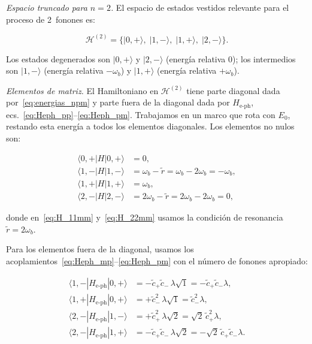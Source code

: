 \documentclass[12pt]{article}
\begin{document}

\textit{Espacio truncado para $n=2$.}
El espacio de estados vestidos relevante para el proceso de 2~fonones es:

\begin{equation}
	\mathcal{H}^{(2)} = \bigl\{
	|0,{+}\rangle,\;|1,{-}\rangle,\;|1,{+}\rangle,\;|2,{-}\rangle
	\bigr\}.
	\label{eq:espacio_n2}
\end{equation}

\noindent
Los estados degenerados son $|0,{+}\rangle$ y $|2,{-}\rangle$
(energía relativa $0$); los intermedios son $|1,{-}\rangle$
(energía relativa $-\omega_b$) y $|1,{+}\rangle$
(energía relativa $+\omega_b$).

\medskip
\noindent
\textit{Elementos de matriz.}
El Hamiltoniano en $\mathcal{H}^{(2)}$ tiene parte diagonal dada
por~\eqref{eq:energias_npm} y parte fuera de la diagonal dada
por $H_\mathrm{e\text{-}ph}$, ecs.~\eqref{eq:Heph_pp}--\eqref{eq:Heph_pm}.
Trabajamos en un marco que rota con $E_0$, restando esta energía
a todos los elementos diagonales. Los elementos no nulos son:

\begin{align}
	\langle 0,{+}|H|0,{+}\rangle &= 0,
	\label{eq:H_00pp}\\[4pt]
	\langle 1,{-}|H|1,{-}\rangle &= \omega_b - \tilde{r}
	= \omega_b - 2\omega_b = -\omega_b,
	\label{eq:H_11mm}\\[4pt]
	\langle 1,{+}|H|1,{+}\rangle &= \omega_b,
	\label{eq:H_11pp}\\[4pt]
	\langle 2,{-}|H|2,{-}\rangle &= 2\omega_b - \tilde{r}
	= 2\omega_b - 2\omega_b = 0,
	\label{eq:H_22mm}
\end{align}

\noindent
donde en~\eqref{eq:H_11mm} y~\eqref{eq:H_22mm} usamos la condición
de resonancia $\tilde{r} = 2\omega_b$.

\medskip
\noindent
Para los elementos fuera de la diagonal, usamos los
acoplamientos~\eqref{eq:Heph_mp}--\eqref{eq:Heph_pm} con el número
de fonones apropiado:

\begin{align}
	\langle 1,{-}|H_\mathrm{e\text{-}ph}|0,{+}\rangle
	&= -\tilde{c}_+\tilde{c}_-\,\lambda\sqrt{1}
	= -\tilde{c}_+\tilde{c}_-\lambda,
	\label{eq:H_10mp}\\[4pt]
	\langle 1,{+}|H_\mathrm{e\text{-}ph}|0,{+}\rangle
	&= +\tilde{c}_-^2\,\lambda\sqrt{1}
	= \tilde{c}_-^2\lambda,
	\label{eq:H_10pp}\\[4pt]
	\langle 2,{-}|H_\mathrm{e\text{-}ph}|1,{-}\rangle
	&= +\tilde{c}_+^2\,\lambda\sqrt{2}
	= \sqrt{2}\,\tilde{c}_+^2\lambda,
	\label{eq:H_21mm}\\[4pt]
	\langle 2,{-}|H_\mathrm{e\text{-}ph}|1,{+}\rangle
	&= -\tilde{c}_+\tilde{c}_-\,\lambda\sqrt{2}
	= -\sqrt{2}\,\tilde{c}_+\tilde{c}_-\lambda.
	\label{eq:H_21mp}
\end{align}
\end{document}
